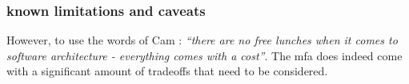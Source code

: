 
\subsubsection{known limitations and caveats}


However, to use the words of Cam \textcite{Jackson_2019}: \textit{``there are no
free lunches when it comes to software architecture - everything comes with a
cost''}. The \gls{mfa} does indeed come with a significant amount of tradeoffs
that need to be considered. 

